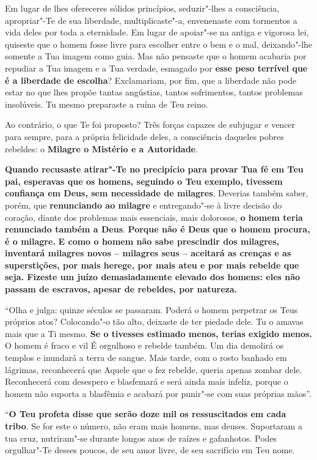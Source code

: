 Em lugar de lhes ofereceres sólidos princípios, seduzir"-lhes a
consciência, apropriar"-Te de sua liberdade, multiplicaste"-a, envenenaste
com tormentos a vida deles por toda a eternidade. Em lugar de apoiar"-se
na antiga e vigorosa lei, quiseste que o homem fosse livre para escolher
entre o bem e o mal, deixando"-lhe somente a Tua imagem como guia. Mas
não pensaste que o homem acabaria por repudiar a Tua imagem e a Tua
verdade, esmagado por \textbf{esse peso terrível que é a liberdade de
escolha}? Exclamariam, por fim, que a liberdade não pode estar no que
lhes propõe tantas angústias, tantos sofrimentos, tantos problemas
insolúveis. Tu mesmo preparaste a ruína de Teu reino.

Ao contrário, o que Te foi proposto? Três forças capazes de subjugar e
vencer para sempre, para a própria felicidade deles, a consciência
daqueles pobres rebeldes: o \textbf{Milagre o Mistério e a Autoridade}.

\textbf{Quando recusaste atirar"-Te no precipício para provar Tua fé em
Teu pai, esperavas que os homens, seguindo o Teu exemplo, tivessem
confiança em Deus, sem necessidade de milagres}. Deverias também saber,
porém, que \textbf{renunciando ao milagre} e entregando"-se à livre
decisão do coração, diante dos problemas mais essenciais, mais
dolorosos, \textbf{o homem teria renunciado também a Deus}.
\textbf{Porque não é Deus que o homem procura, é o milagre.} \textbf{E
como o homem não sabe prescindir dos milagres, inventará milagres novos
-- milagres seus -- aceitará as crenças e as superstições, por mais
herege, por mais ateu e por mais rebelde que seja. Fizeste um juízo
demasiadamente elevado dos homens: eles não passam de escravos, apesar
de rebeldes, por natureza.}

``Olha e julga: quinze séculos se passaram. Poderá o homem perpetrar os
Teus próprios atos? Colocando"-o tão alto, deixaste de ter piedade dele.
Tu o amavas mais que a Ti mesmo. \textbf{Se o tivesses estimado menos,
terias exigido menos.} O homem é fraco e vil É orgulhoso e rebelde
também. Um dia demolirá os templos e inundará a terra de sangue. Mais
tarde, com o rosto banhado em lágrimas, reconhecerá que Aquele que o fez
rebelde, queria apenas zombar dele. Reconhecerá com desespero e
blasfemará e será ainda mais infeliz, porque o homem não suporta a
blasfêmia e acabará por punir"-se com suas próprias mãos''.

``\textbf{O Teu profeta disse que serão doze mil os ressuscitados em
cada tribo}. Se for este o número, não eram mais homens, mas deuses.
Suportaram a tua cruz, nutriram"-se durante longos anos de raízes e
gafanhotos. Podes orgulhar"-Te desses poucos, de seu amor livre, de seu
sacrifício em Teu nome.

